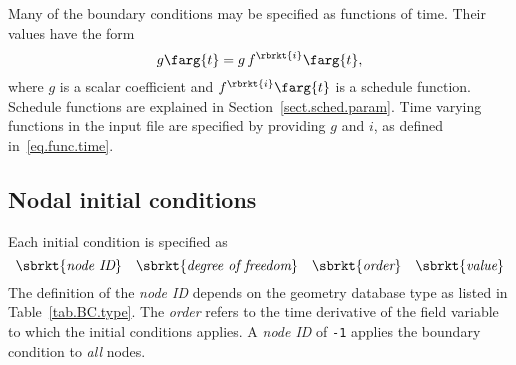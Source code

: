 Many of the boundary conditions may be specified as functions of 
time. Their values have the form
\begin{equation}
\label{eq.func.time}
    g\farg{t} = g\,f^{\rbrkt{i}}\farg{t},
\end{equation}
where $g$ is a scalar coefficient and $f^{\rbrkt{i}}\farg{t}$ is a
schedule function. Schedule functions are explained in 
Section~\ref{sect.sched.param}. Time varying functions in the input 
file are specified by providing $g$ and $i$, as defined 
in~\eqref{eq.func.time}.

\subsection{Nodal initial conditions}
\label{set.ICandBC.IC}
Each initial condition is specified as
\[
\sbrkt{\textit{node ID}} \quad 
\sbrkt{\textit{degree of freedom}} \quad
\sbrkt{\textit{order}} \quad
\sbrkt{\textit{value}}
\]
The definition of the \textit{node ID} depends on the geometry 
database type as listed in Table~\ref{tab.BC.type}. The \textit{order} refers to the time derivative of the field variable to which the initial conditions applies. A \textit{node ID} of \texttt{-1} applies the boundary condition to \textit{all} nodes.

